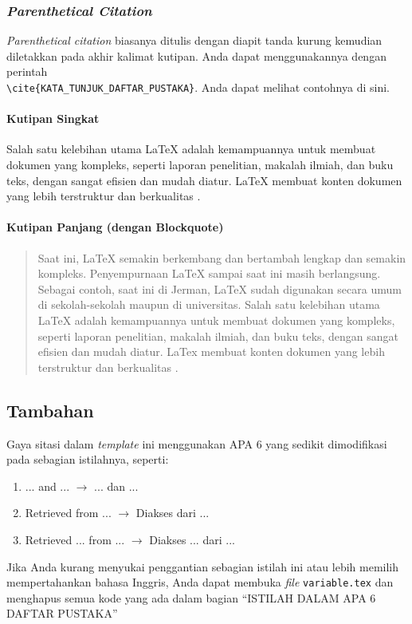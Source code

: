 \subsubsection{\textit{Parenthetical Citation}}

\textit{Parenthetical citation} biasanya ditulis dengan diapit tanda kurung kemudian diletakkan pada akhir kalimat kutipan. Anda dapat menggunakannya dengan perintah \\ \verb|\cite{KATA_TUNJUK_DAFTAR_PUSTAKA}|. Anda dapat melihat contohnya di sini.

\paragraph{Kutipan Singkat}

Salah satu kelebihan utama LaTeX adalah kemampuannya untuk membuat dokumen yang kompleks, seperti laporan penelitian, makalah ilmiah, dan buku teks, dengan sangat efisien dan mudah diatur. LaTeX membuat konten dokumen yang lebih terstruktur dan berkualitas \cite{fitriani-2024:pelatihan-latex}.

\paragraph{Kutipan Panjang (dengan Blockquote)}

\begin{quote}
    Saat ini, LaTeX semakin berkembang dan bertambah lengkap dan semakin kompleks. Penyempurnaan LaTeX sampai saat ini masih berlangsung. Sebagai contoh, saat ini di Jerman, LaTeX sudah digunakan secara umum di sekolah-sekolah maupun di universitas. Salah satu kelebihan utama LaTeX adalah kemampuannya untuk membuat dokumen yang kompleks, seperti laporan penelitian, makalah ilmiah, dan buku teks, dengan sangat efisien dan mudah diatur. LaTex membuat konten dokumen yang lebih terstruktur dan berkualitas \cite{fitriani-2024:pelatihan-latex}.
\end{quote}

\subsection{Tambahan}

Gaya sitasi dalam \textit{template} ini menggunakan APA 6 yang sedikit dimodifikasi pada sebagian istilahnya, seperti:

\begin{enumerate}[nosep]
    \item ... and ... $\longrightarrow$ ... dan ...
    \item Retrieved from ... $\longrightarrow$ Diakses dari ...
    \item Retrieved ... from ... $\longrightarrow$ Diakses ... dari ...
\end{enumerate}

Jika Anda kurang menyukai penggantian sebagian istilah ini atau lebih memilih mempertahankan bahasa Inggris, Anda dapat membuka \textit{file} \texttt{variable.tex} dan menghapus semua kode yang ada dalam bagian ``ISTILAH DALAM APA 6 DAFTAR PUSTAKA''